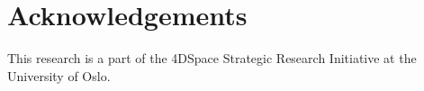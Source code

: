 \documentclass[%
oneside,                 %
final,                   %
10pt]{article}
\theoremstyle{definition}
\begin{document}
\section{Acknowledgements}
This research is a part of the 4DSpace Strategic Research Initiative at the University of Oslo. 









\cleardoublepage{}  %
\printindex
\end{document}
